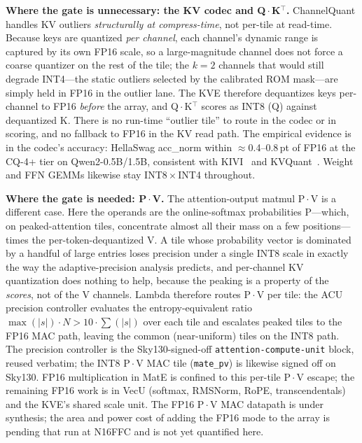 \documentclass[conference]{IEEEtran}
\begin{document}
\textbf{Where the gate is unnecessary: the KV codec and Q\,$\cdot$\,K$^\top$.} ChannelQuant handles KV outliers \emph{structurally at compress-time}, not per-tile at read-time. Because keys are quantized \emph{per channel}, each channel's dynamic range is captured by its own FP16 scale, so a large-magnitude channel does not force a coarse quantizer on the rest of the tile; the $k{=}2$ channels that would still degrade INT4---the static outliers selected by the calibrated ROM mask---are simply held in FP16 in the outlier lane. The KVE therefore dequantizes keys per-channel to FP16 \emph{before} the array, and Q\,$\cdot$\,K$^\top$ scores as INT8 (Q) against dequantized K. There is no run-time ``outlier tile'' to route in the codec or in scoring, and no fallback to FP16 in the KV read path. The empirical evidence is in the codec's accuracy: HellaSwag acc\_norm within $\approx$0.4--0.8\,pt of FP16 at the CQ-4+ tier on Qwen2-0.5B/1.5B, consistent with KIVI~\cite{kivi} and KVQuant~\cite{kvquant}. Weight and FFN GEMMs likewise stay INT8\,$\times$\,INT4 throughout.

\textbf{Where the gate is needed: P\,$\cdot$\,V.} The attention-output matmul P\,$\cdot$\,V is a different case. Here the operands are the online-softmax probabilities P---which, on peaked-attention tiles, concentrate almost all their mass on a few positions---times the per-token-dequantized V. A tile whose probability vector is dominated by a handful of large entries loses precision under a single INT8 scale in exactly the way the adaptive-precision analysis predicts, and per-channel KV quantization does nothing to help, because the peaking is a property of the \emph{scores}, not of the V channels. Lambda therefore routes P\,$\cdot$\,V per tile: the ACU precision controller evaluates the entropy-equivalent ratio $\max(|s|)\cdot N > 10\cdot\sum(|s|)$ over each tile and escalates peaked tiles to the FP16 MAC path, leaving the common (near-uniform) tiles on the INT8 path. The precision controller is the Sky130-signed-off \texttt{attention-compute-unit} block, reused verbatim; the INT8 P\,$\cdot$\,V MAC tile (\texttt{mate\_pv}) is likewise signed off on Sky130. FP16 multiplication in MatE is confined to this per-tile P\,$\cdot$\,V escape; the remaining FP16 work is in VecU (softmax, RMSNorm, RoPE, transcendentals) and the KVE's shared scale unit. The FP16 P\,$\cdot$\,V MAC datapath is under synthesis; the area and power cost of adding the FP16 mode to the array is pending that run at N16FFC and is not yet quantified here.

\end{document}
